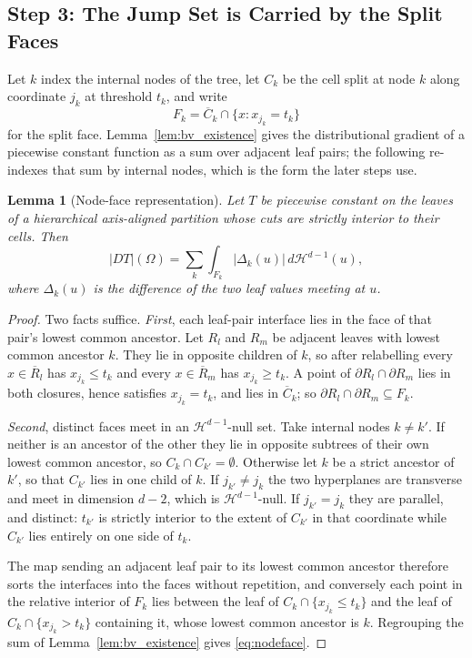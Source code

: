 \documentclass[12pt,a4paper]{article}
\numberwithin{equation}{section}
\theoremstyle{plain}
\newtheorem{lemma}{Lemma}
\theoremstyle{definition}
\newcommand{\abs}[1]{\left| #1 \right|}
\begin{document}
	\subsection{Step 3: The Jump Set is Carried by the Split Faces}

	Let $k$ index the internal nodes of the tree, let $C_k$ be the cell split at
	node $k$ along coordinate $j_k$ at threshold $t_k$, and write
	\begin{equation}
		F_k = \overline{C}_k \cap \{x : x_{j_k} = t_k\}
	\end{equation}
	for the split face. Lemma~\ref{lem:bv_existence} gives the distributional
	gradient of a piecewise constant function as a sum over adjacent leaf pairs;
	the following re-indexes that sum by internal nodes, which is the form the
	later steps use.

	\begin{lemma}[Node-face representation]
		\label{lem:nodeface}
		Let $T$ be piecewise constant on the leaves of a hierarchical
		axis-aligned partition whose cuts are strictly interior to their cells.
		Then
		\begin{equation}
			|DT|(\Omega)
			= \sum_k \int_{F_k} \abs{\Delta_k(u)}\, d\mathcal{H}^{d-1}(u),
			\label{eq:nodeface}
		\end{equation}
		where $\Delta_k(u)$ is the difference of the two leaf values meeting at
		$u$.
	\end{lemma}

	\begin{proof}
		Two facts suffice. \emph{First}, each leaf-pair interface lies in the
		face of that pair's lowest common ancestor. Let $R_l$ and $R_m$ be
		adjacent leaves with lowest common ancestor $k$. They lie in opposite
		children of $k$, so after relabelling every $x \in \overline{R}_l$ has
		$x_{j_k} \leq t_k$ and every $x \in \overline{R}_m$ has
		$x_{j_k} \geq t_k$. A point of $\partial R_l \cap \partial R_m$ lies in
		both closures, hence satisfies $x_{j_k} = t_k$, and lies in
		$\overline{C}_k$; so $\partial R_l \cap \partial R_m \subseteq F_k$.

		\emph{Second}, distinct faces meet in an $\mathcal{H}^{d-1}$-null set.
		Take internal nodes $k \neq k'$. If neither is an ancestor of the other
		they lie in opposite subtrees of their own lowest common ancestor, so
		$C_k \cap C_{k'} = \emptyset$. Otherwise let $k$ be a strict ancestor of
		$k'$, so that $C_{k'}$ lies in one child of $k$. If $j_{k'} \neq j_k$
		the two hyperplanes are transverse and meet in dimension $d-2$, which is
		$\mathcal{H}^{d-1}$-null. If $j_{k'} = j_k$ they are parallel, and
		distinct: $t_{k'}$ is strictly interior to the extent of $C_{k'}$ in
		that coordinate while $C_{k'}$ lies entirely on one side of $t_k$.

		The map sending an adjacent leaf pair to its lowest common ancestor
		therefore sorts the interfaces into the faces without repetition, and
		conversely each point in the relative interior of $F_k$ lies between the
		leaf of $C_k \cap \{x_{j_k} \le t_k\}$ and the leaf of
		$C_k \cap \{x_{j_k} > t_k\}$ containing it, whose lowest common ancestor
		is $k$. Regrouping the sum of Lemma~\ref{lem:bv_existence} gives
		\eqref{eq:nodeface}.
	\end{proof}
\end{document}
